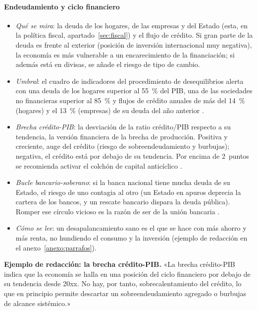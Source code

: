 \documentclass[11pt]{article}
\begin{document}
\paragraph{Endeudamiento y ciclo financiero}
\begin{itemize}
\item \emph{Qué se mira}: la deuda de los hogares, de las empresas y del Estado (esta, en la política fiscal, apartado~\ref{sec:fiscal}) y el flujo de crédito. Si gran parte de la deuda es frente al exterior (posición de inversión internacional muy negativa), la economía es más vulnerable a un encarecimiento de la financiación; si además está en divisas, se añade el riesgo de tipo de cambio.
\item \emph{Umbral}: el cuadro de indicadores del procedimiento de desequilibrios alerta con una deuda de los hogares superior al 55~\% del PIB, una de las sociedades no financieras superior al 85~\% y flujos de crédito anuales de más del 14~\% (hogares) y el 13~\% (empresas) de su deuda del año anterior \parencite{CE2025AMR2026,Eurostat2025MIP}.
\item \emph{Brecha crédito-PIB}: la desviación de la ratio crédito/PIB respecto a su tendencia, la versión financiera de la brecha de producción. Positiva y creciente, auge del crédito (riesgo de sobreendeudamiento y burbujas); negativa, el crédito está por debajo de su tendencia. Por encima de 2~puntos se recomienda activar el colchón de capital anticíclico \parencite{BCBS2010Anticiclico}  .
\item \emph{Bucle bancario-soberano}: si la banca nacional tiene mucha deuda de su Estado, el riesgo de uno contagia al otro (un Estado en apuros deprecia la cartera de los bancos, y un rescate bancario dispara la deuda pública). Romper ese círculo vicioso es la razón de ser de la unión bancaria .
\item \emph{Cómo se lee}: un desapalancamiento sano es el que se hace con más ahorro y más renta, no hundiendo el consumo y la inversión (ejemplo de redacción en el anexo~\ref{anexo:parrafos}).
\end{itemize}

\begin{anotaciones}
\textbf{Ejemplo de redacción: la brecha crédito-PIB.}
«La brecha crédito-PIB indica que la economía se halla en una posición del ciclo financiero por debajo de su tendencia desde 20xx. No hay, por tanto, sobrecalentamiento del crédito, lo que en principio permite descartar un sobreendeudamiento agregado o burbujas de alcance sistémico.»
\end{anotaciones}
\end{document}
